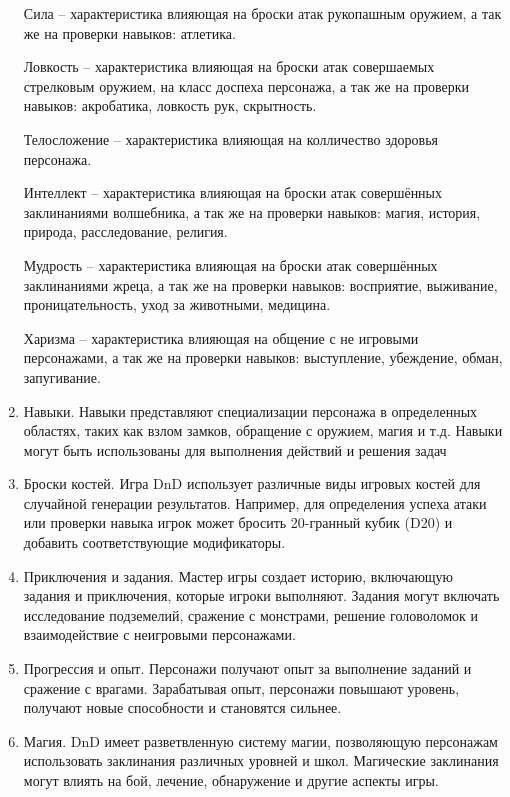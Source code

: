 \begin{enumerate}
			Сила -- характеристика влияющая на броски атак рукопашным оружием, а так же на проверки навыков: атлетика.
			
			Ловкость -- характеристика влияющая на броски атак совершаемых стрелковым оружием, на класс доспеха персонажа, а так же на проверки навыков: акробатика, ловкость рук, скрытность.
			 
			Телосложение -- характеристика влияющая на колличество здоровья персонажа.
			
			Интеллект -- характеристика влияющая на броски атак совершённых заклинаниями волшебника, а так же на проверки навыков: магия, история, природа, расследование, религия.
			
			Мудрость -- характеристика влияющая на броски атак  совершённых заклинаниями жреца, а так же на проверки навыков: восприятие, выживание, проницательность, уход за животными, медицина.
			 
			Харизма -- характеристика влияющая на общение с не игровыми персонажами, а так же на проверки навыков: выступление, убеждение, обман, запугивание.
			 
		\item Навыки. Навыки представляют специализации персонажа в определенных областях, таких как взлом замков, обращение с оружием, магия и т.д. Навыки могут быть использованы для выполнения действий и решения задач
		\item Броски костей.
			 Игра DnD использует различные виды игровых костей для случайной генерации результатов. Например, для определения успеха атаки или проверки навыка игрок может бросить 20-гранный кубик (D20) и добавить соответствующие модификаторы.
		\item Приключения и задания.
			 Мастер игры создает историю, включающую задания и приключения, которые игроки выполняют. Задания могут включать исследование подземелий, сражение с монстрами, решение головоломок и взаимодействие с неигровыми персонажами.
		\item Прогрессия и опыт.
			Персонажи получают опыт за выполнение заданий и сражение с врагами. Зарабатывая опыт, персонажи повышают уровень, получают новые способности и становятся сильнее.
		\item Магия.
			DnD имеет разветвленную систему магии, позволяющую персонажам использовать заклинания различных уровней и школ. Магические заклинания могут влиять на бой, лечение, обнаружение и другие аспекты игры.
	\end{enumerate}
